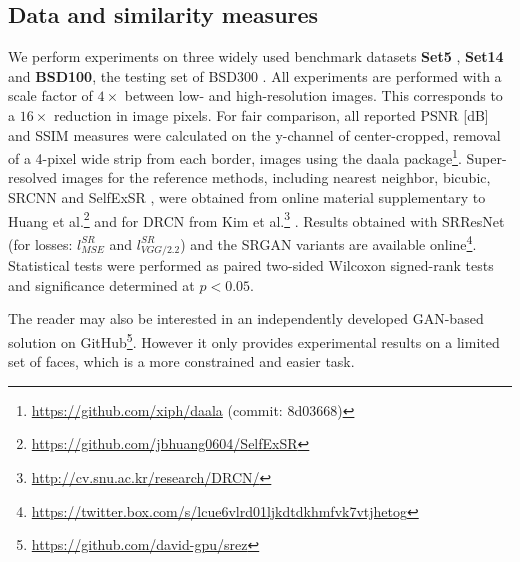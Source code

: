 \documentclass[10pt,twocolumn,letterpaper]{article}
\begin{document}
\subsection{Data and similarity measures}
\label{subsec:data}
We perform experiments on three widely used benchmark datasets \textbf{Set5} \cite{bevilacqua2012low}, \textbf{Set14} \cite{zeyde2012single} and \textbf{BSD100}, the testing set of BSD300 \cite{MartinFTM01}. All experiments are performed with a scale factor of $4\times$ between low- and high-resolution images. This corresponds to a $16\times$ reduction in image pixels. For fair comparison, all reported \ac{PSNR} [dB] and \ac{SSIM} \cite{Wang2004} measures were calculated on the y-channel of center-cropped, removal of a 4-pixel wide strip from each border, images using the daala package\footnote{\url{https://github.com/xiph/daala} (commit: 8d03668)}. Super-resolved images for the reference methods, including nearest neighbor, bicubic, SRCNN \cite{dong2014learning} and SelfExSR \cite{Huang15selfexemplars}, were obtained from online material supplementary to Huang et al.\footnote{\url{https://github.com/jbhuang0604/SelfExSR}} \cite{Huang15selfexemplars} and for DRCN from Kim et al.\footnote{\url{http://cv.snu.ac.kr/research/DRCN/}} \cite{kim2016deeply}.
Results obtained with SRResNet (for losses: $l^{SR}_{MSE}$ and $l^{SR}_{VGG/2.2}$) and the SRGAN variants are available online\footnote{\url{https://twitter.box.com/s/lcue6vlrd01ljkdtdkhmfvk7vtjhetog}}.
Statistical tests were performed as paired two-sided Wilcoxon signed-rank tests and significance determined at $p<0.05$.

The reader may also be interested in an independently developed GAN-based solution on GitHub\footnote{\url{https://github.com/david-gpu/srez}}. However it only provides experimental results on a limited set of faces, which is a more constrained and easier task.
\end{document}
